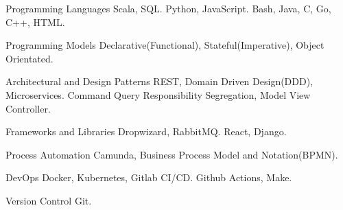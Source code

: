 

\begin{cvskills}
  \cvskill
    {Programming Languages} %
    {  Scala, SQL.} 
  \cvskill
    {} %
    {  Python, JavaScript. } 
  \cvskill
    {} %
    {  Bash, Java, C, Go, C++, HTML.} 

  \cvskill
    {Programming Models} %
    { Declarative(Functional), Stateful(Imperative), Object Orientated.} 

  \cvskill
    {Architectural and Design Patterns} %
    {  REST, Domain Driven Design(DDD), Microservices.}
    \cvskill
    {} %
    {  Command Query Responsibility Segregation, Model View Controller.} 

  \cvskill
    {Frameworks and Libraries} %
    {  Dropwizard, RabbitMQ.} 
  \cvskill
    {} %
    {  React, Django.} 

  \cvskill
    {Process Automation}
    { Camunda, Business Process Model and Notation(BPMN).}

  \cvskill
    {DevOps} %
    { Docker, Kubernetes, Gitlab CI/CD.} %
  \cvskill
    {} %
    {  Github Actions, Make.} 

  \cvskill
  {Version Control} %
  { Git.} %

\end{cvskills}
